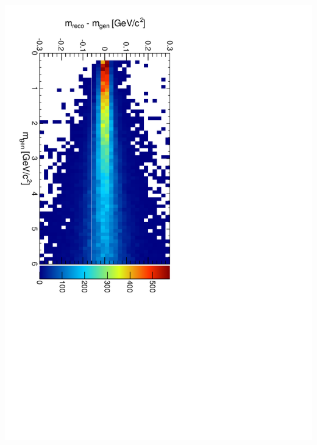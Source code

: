 \documentclass[compress]{beamer}
\begin{document}
\begin{frame}
\begin{columns}
\includegraphics[height=\linewidth, angle=90]{deltamass_vs_mass.pdf}
\end{columns}
\end{frame}
\end{document}
